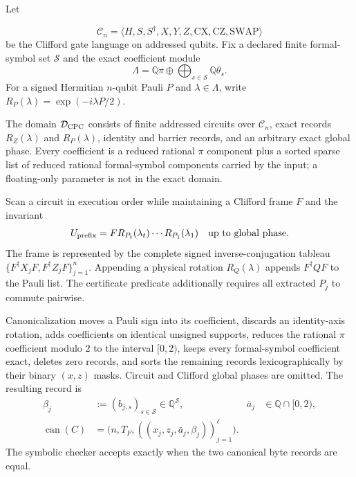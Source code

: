 
Let


\begin{equation*}
 \mathcal C_n=\langle H,S,S^\dagger,X,Y,Z,\mathrm{CX},
 \mathrm{CZ},\mathrm{SWAP}\rangle
\end{equation*}
be the Clifford gate language on addressed qubits.  Fix a declared finite
formal-symbol set $\mathcal S$ and the exact coefficient module
\begin{equation*}
 \Lambda=\mathbb Q\pi\oplus
 \bigoplus_{s\in\mathcal S}\mathbb Q\theta_s.
\end{equation*}
For a signed Hermitian $n$-qubit Pauli $P$ and $\lambda\in\Lambda$, write
$R_P(\lambda)=\exp(-i\lambda P/2)$.

\begin{definition}
\label{def:certificate}
The domain $\mathcal D_{\rm CPC}$ consists of finite addressed circuits over
$\mathcal C_n$, exact records $R_Z(\lambda)$ and $R_P(\lambda)$, identity and
barrier records, and an arbitrary exact global phase.  Every coefficient is
a reduced rational $\pi$ component plus a sorted sparse list of reduced
rational formal-symbol components carried by the input; a floating-only
parameter is not in the exact domain.

Scan a circuit in execution order while maintaining a Clifford frame $F$ and
the invariant
\begin{equation}
 U_{\rm prefix}=F R_{P_t}(\lambda_t)\cdots R_{P_1}(\lambda_1)
 \quad\text{up to global phase}.
 \label{eq:w6-frame-invariant}
\end{equation}
The frame is represented by the complete signed inverse-conjugation tableau
$\{F^\dagger X_jF,F^\dagger Z_jF\}_{j=1}^n$.  Appending a physical rotation
$R_Q(\lambda)$ appends $F^\dagger QF$ to the Pauli list.  The certificate
predicate additionally requires all extracted $P_j$ to commute pairwise.

Canonicalization moves a Pauli sign into its coefficient, discards an
identity-axis rotation, adds coefficients on identical unsigned supports,
reduces the rational $\pi$ coefficient modulo $2$ to the interval $[0,2)$,
keeps every formal-symbol coefficient exact, deletes zero records, and sorts the remaining records lexicographically by
their binary $(x,z)$ masks.  Circuit and Clifford global phases are omitted.
The resulting record is
\begin{align}
 \beta_j&:=(b_{j,s})_{s\in\mathcal S}\in\mathbb Q^{\mathcal S},
 &\bar a_j&\in\mathbb Q\cap[0,2),\nonumber\\
 \operatorname{can}(C)&=
 \bigl(n,T_F,((x_j,z_j,\bar a_j,\beta_j))_{j=1}^{\ell}\bigr).
 \label{eq:w6-canonical-record}
\end{align}
The symbolic checker accepts exactly when the two canonical byte records are
equal.
\end{definition}

